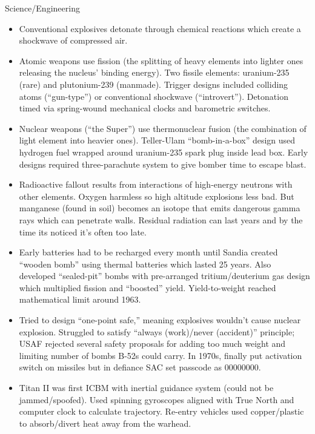 \documentclass[
]{article}
\begin{document}
Science/Engineering

\begin{itemize}
\item
  Conventional explosives detonate through chemical reactions which
  create a shockwave of compressed air.
\item
  Atomic weapons use fission (the splitting of heavy elements into
  lighter ones releasing the nucleus' binding energy). Two fissile
  elements: uranium-235 (rare) and plutonium-239 (manmade). Trigger
  designs included colliding atoms (``gun-type'') or conventional
  shockwave (``introvert''). Detonation timed via spring-wound
  mechanical clocks and barometric switches.
\item
  Nuclear weapons (``the Super'') use thermonuclear fusion (the
  combination of light element into heavier ones). Teller-Ulam
  ``bomb-in-a-box'' design used hydrogen fuel wrapped around uranium-235
  spark plug inside lead box. Early designs required three-parachute
  system to give bomber time to escape blast.
\item
  Radioactive fallout results from interactions of high-energy neutrons
  with other elements. Oxygen harmless so high altitude explosions less
  bad. But manganese (found in soil) becomes an isotope that emits
  dangerous gamma rays which can penetrate walls. Residual radiation can
  last years and by the time its noticed it's often too late.
\item
  Early batteries had to be recharged every month until Sandia created
  ``wooden bomb'' using thermal batteries which lasted 25 years. Also
  developed ``sealed-pit'' bombs with pre-arranged tritium/deuterium gas
  design which multiplied fission and ``boosted'' yield. Yield-to-weight
  reached mathematical limit around 1963.
\item
  Tried to design ``one-point safe,'' meaning explosives wouldn't cause
  nuclear explosion. Struggled to satisfy ``always (work)/never
  (accident)'' principle; USAF rejected several safety proposals for
  adding too much weight and limiting number of bombs B-52s could carry.
  In 1970s, finally put activation switch on missiles but in defiance
  SAC set passcode as 00000000.
\item
  Titan II was first ICBM with inertial guidance system (could not be
  jammed/spoofed). Used spinning gyroscopes aligned with True North and
  computer clock to calculate trajectory. Re-entry vehicles used
  copper/plastic to absorb/divert heat away from the warhead.
\end{itemize}
\end{document}
